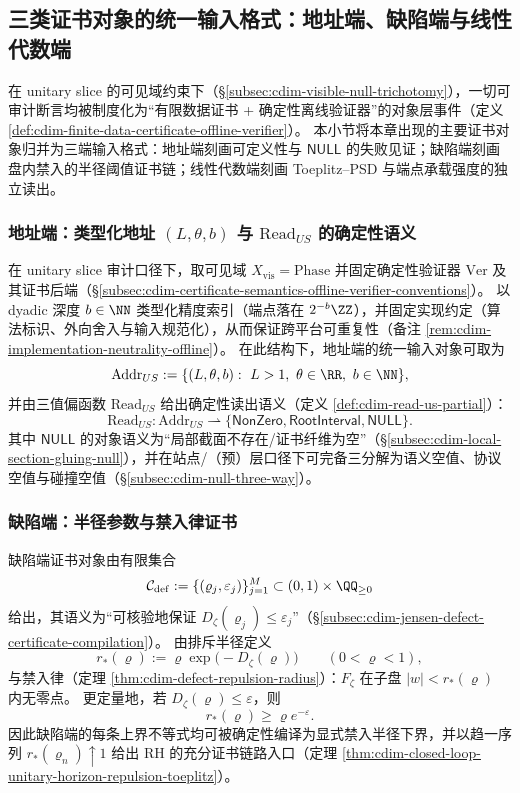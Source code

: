 \subsection{三类证书对象的统一输入格式：地址端、缺陷端与线性代数端}\label{subsec:cdim-three-end-certificate-format}
在 unitary slice 的可见域约束下（\S\ref{subsec:cdim-visible-null-trichotomy}），一切可审计断言均被制度化为“有限数据证书 + 确定性离线验证器”的对象层事件（定义 \ref{def:cdim-finite-data-certificate-offline-verifier}）。
本小节将本章出现的主要证书对象归并为三端输入格式：地址端刻画可定义性与 \(\mathsf{NULL}\) 的失败见证；缺陷端刻画盘内禁入的半径阈值证书链；线性代数端刻画 Toeplitz--PSD 与端点承载强度的独立读出。

\subsubsection{地址端：类型化地址 \texorpdfstring{$(L,\theta,b)$}{(L,theta,b)} 与 \texorpdfstring{$\mathrm{Read}_{US}$}{Read\_US} 的确定性语义}\label{subsubsec:cdim-three-end-addr}
在 unitary slice 审计口径下，取可见域 \(X_{\mathrm{vis}}=\mathrm{Phase}\) 并固定确定性验证器 \(\mathrm{Ver}\) 及其证书后端（\S\ref{subsec:cdim-certificate-semantics-offline-verifier-conventions}）。
以 dyadic 深度 \(b\in\NN\) 类型化精度索引（端点落在 \(2^{-b}\ZZ\)），并固定实现约定（算法标识、外向舍入与输入规范化），从而保证跨平台可重复性（备注 \ref{rem:cdim-implementation-neutrality-offline}）。
在此结构下，地址端的统一输入对象可取为
\[
\mathrm{Addr}_{US}:=\{(L,\theta,b):\ L>1,\ \theta\in\RR,\ b\in\NN\},
\]
并由三值偏函数 \(\mathrm{Read}_{US}\) 给出确定性读出语义（定义 \ref{def:cdim-read-us-partial}）：
\[
\mathrm{Read}_{US}:\mathrm{Addr}_{US}\rightharpoonup
\{\mathsf{NonZero},\mathsf{RootInterval},\mathsf{NULL}\}.
\]
其中 \(\mathsf{NULL}\) 的对象语义为“局部截面不存在/证书纤维为空”（\S\ref{subsec:cdim-local-section-gluing-null}），并在站点/（预）层口径下可完备三分解为语义空值、协议空值与碰撞空值（\S\ref{subsec:cdim-null-three-way}）。

\subsubsection{缺陷端：半径参数与禁入律证书}\label{subsubsec:cdim-three-end-defect}
缺陷端证书对象由有限集合
\[
\mathcal{C}_{\mathrm{def}}:=\{(\varrho_j,\varepsilon_j)\}_{j=1}^{M}\subset(0,1)\times\QQ_{\ge 0}
\]
给出，其语义为“可核验地保证 \(D_{\zeta}(\varrho_j)\le \varepsilon_j\)”（\S\ref{subsec:cdim-jensen-defect-certificate-compilation}）。
由排斥半径定义
\[
r_{\ast}(\varrho):=\varrho\exp\!\bigl(-D_{\zeta}(\varrho)\bigr)\qquad(0<\varrho<1),
\]
与禁入律（定理 \ref{thm:cdim-defect-repulsion-radius}）：\(F_{\zeta}\) 在子盘 \(|w|<r_{\ast}(\varrho)\) 内无零点。
更定量地，若 \(D_{\zeta}(\varrho)\le \varepsilon\)，则
\[
r_{\ast}(\varrho)\ge \varrho e^{-\varepsilon}.
\]
因此缺陷端的每条上界不等式均可被确定性编译为显式禁入半径下界，并以趋一序列 \(r_{\ast}(\varrho_n)\uparrow 1\) 给出 RH 的充分证书链路入口（定理 \ref{thm:cdim-closed-loop-unitary-horizon-repulsion-toeplitz}）。

